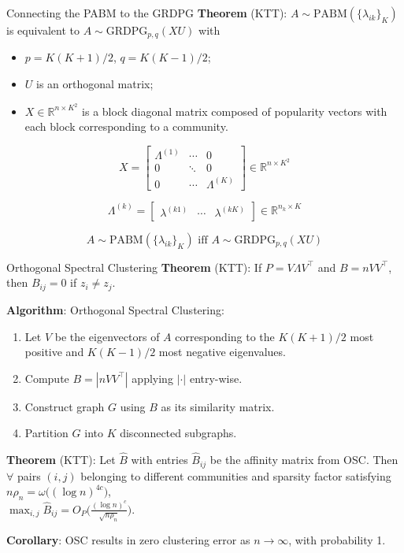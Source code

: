 \documentclass[
  ignorenonframetext,
]{beamer}
\providecommand{\tightlist}{%
  \setlength{\itemsep}{0pt}\setlength{\parskip}{0pt}}
\begin{document}
\begin{frame}{Connecting the PABM to the GRDPG}
\protect\hypertarget{connecting-the-pabm-to-the-grdpg}{}
\textbf{Theorem} (KTT): \(A \sim \text{PABM}(\{\lambda_{ik}\}_K)\) is
equivalent to \(A \sim \text{GRDPG}_{p, q}(X U)\) with

\begin{itemize}
\tightlist
\item
  \(p = K (K + 1) / 2\), \(q = K (K - 1) / 2\);
\item
  \(U\) is an orthogonal matrix;
\item
  \(X \in \mathbb{R}^{n \times K^2}\) is a block diagonal matrix
  composed of popularity vectors with each block corresponding to a
  community.
\end{itemize}

\[X = \begin{bmatrix}
\Lambda^{(1)} & \cdots & 0 \\
0 & \ddots & 0 \\
0 & \cdots & \Lambda^{(K)}
\end{bmatrix} 
\in \mathbb{R}^{n \times K^2}\]

\[\Lambda^{(k)} = \begin{bmatrix} 
\lambda^{(k1)} & \cdots & \lambda^{(kK)} 
\end{bmatrix} 
\in \mathbb{R}^{n_k \times K}\]

\[A \sim \text{PABM}(\{\lambda_{ik}\}_K) \text{ iff } A \sim \text{GRDPG}_{p, q}(X U)\]
\end{frame}

\begin{frame}{Orthogonal Spectral Clustering}
\protect\hypertarget{orthogonal-spectral-clustering}{}
\textbf{Theorem} (KTT): If \(P = V \Lambda V^\top\) and
\(B = n V V^\top\),\\
then \(B_{ij} = 0\) if \(z_i \neq z_j\).

\textbf{Algorithm}: Orthogonal Spectral Clustering:

\begin{enumerate}
\tightlist
\item
  Let \(V\) be the eigenvectors of \(A\) corresponding to the
  \(K (K+1)/2\) most positive and \(K (K-1) / 2\) most negative
  eigenvalues.
\item
  Compute \(B = |n V V^\top|\) applying \(|\cdot|\) entry-wise.
\item
  Construct graph \(G\) using \(B\) as its similarity matrix.
\item
  Partition \(G\) into \(K\) disconnected subgraphs.
\end{enumerate}

\textbf{Theorem} (KTT): Let \(\hat{B}\) with entries \(\hat{B}_{ij}\) be
the affinity matrix from OSC. Then \(\forall\) pairs \((i, j)\)
belonging to different communities and sparsity factor satisfying
\(n \rho_n = \omega\big((\log n)^{4c}\big)\),\\
\(\max_{i, j} \hat{B}_{ij} = O_P \Big( \frac{(\log n)^c}{\sqrt{n \rho_n}} \Big)\).

\textbf{Corollary}: OSC results in zero clustering error as
\(n \to \infty\), with probability 1.
\end{frame}
\end{document}
